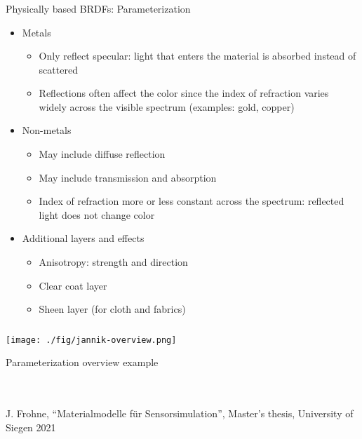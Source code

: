 \documentclass[utf8,stillsansserifmath,fleqn,t]{beamer}
\newcommand{\literature}[1]{{\tiny #1 \par}}
\begin{document}
\begin{frame}
\frametitle{\insertsection}
Physically based BRDFs: Parameterization
\begin{itemize}
\item Metals
    \begin{itemize}
    \item Only reflect specular: light that enters the material is absorbed instead of scattered
    \item Reflections often affect the color since the index of refraction varies widely across the visible spectrum (examples: gold, copper)
    \end{itemize}
\item Non-metals
    \begin{itemize}
    \item May include diffuse reflection
    \item May include transmission and absorption
    \item Index of refraction more or less constant across the spectrum: reflected light does not change color
    \end{itemize}
\item Additional layers and effects
    \begin{itemize}
    \item Anisotropy: strength and direction
    \item Clear coat layer 
    \item Sheen layer (for cloth and fabrics)
    \end{itemize}
\end{itemize}
\end{frame}

\begin{frame}[label=materials-parameterization]
\frametitle{\insertsection}
\begin{minipage}{.62\textwidth}
\texttt{[image: ./fig/jannik-overview.png]}
\end{minipage}\hfill
\begin{minipage}{.37\textwidth}
Parameterization overview example\\
~\\~\\
\literature{J. Frohne, ``Materialmodelle für Sensorsimulation'', Master's thesis, University of Siegen 2021}
\end{minipage}
\end{frame}
\end{document}
